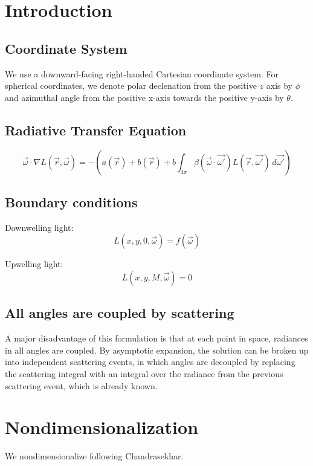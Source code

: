 \documentclass[10pt]{article}
\begin{document}
\section{Introduction}
\subsection{Coordinate System}
We use a downward-facing right-handed Cartesian coordinate system.
For spherical coordinates, we denote polar declenation from the positive $z$
axis by $\phi$ and azimuthal angle from the positive x-axis towards the positive
y-axis by $\theta$.
\subsection{Radiative Transfer Equation}
\begin{equation}
  \label{eq:RTE}
  \vec{\omega} \cdot \nabla L(\vec{r},\vec{\omega})
  = -(a(\vec{r}) + b(\vec{r}) + b\int_{4\pi}
  \beta(\vec{\omega} \cdot \vec{\omega'})
  L(\vec{r},\vec{\omega'}) \, d\vec{\omega'})
\end{equation}

\subsection{Boundary conditions}
Downwelling light:
\begin{equation}
  L(x,y,0, \vec{\omega}) = f(\vec{\omega})
\end{equation}

Upwelling light:
\begin{equation}
  L(x,y,M, \vec{\omega}) = 0
\end{equation}

\subsection{All angles are coupled by scattering}
A major disadvantage of this formulation is that at each point in space,
radiances in all angles are coupled. By asymptotic expansion, the solution can
be broken up into independent scattering events, in which angles are decoupled
by replacing the scattering integral with an integral over the radiance from the
previous scattering event, which is already known.

\section{Nondimensionalization}
We nondimensionalize following Chandrasekhar.
\end{document}
